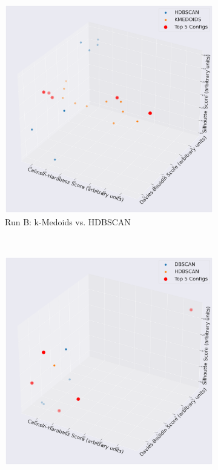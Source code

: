 \documentclass[10pt,oneside]{report}
\begin{document}
\begin{figure}[H]
\begin{subfigure}[b]{0.48\textwidth}
        \includegraphics[width=\textwidth]{./images/nomic_kmedoidsvshdbscan.png}
        \caption{Run B: k-Medoids vs. HDBSCAN}
        \label{fig:nomic_kmedoids_vs_hdbscan_h2h_config}
    \end{subfigure}
    \\
    \vspace{1em}
    \begin{subfigure}[b]{0.48\textwidth}
        \centering
        \includegraphics[width=\textwidth]{./images/nomic_dbscanvshdbscan.png}

\end{subfigure}
\end{figure}
\end{document}
